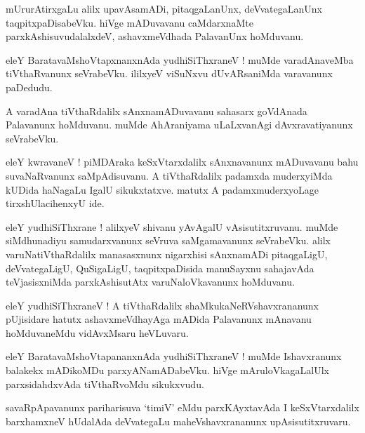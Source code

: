 \documentclass{article}
\begin{document}
\begin{mn}
mUrurAtirxgaLu alilx upavAsamADi, pitaqgaLanUnx, deVvategaLanUnx taqpitxpaDisabeVku. hiVge 
mADuvavanu caMdarxnaMte parxkAshisuvudalalxdeV, ashavxmeVdhada PalavanUnx hoMduvanu.
\end{mn}

\begin{mn}
eleY BaratavaMshoVtapxnanxnAda yudhiSiThxraneV ! muMde varadAnaveMba tiVthaRvanunx seVrabeVku.
ililxyeV viSuNxvu dUvARsaniMda varavanunx paDedudu.
\end{mn}

\begin{mn}
A varadAna tiVthaRdalilx sAnxnamADuvavanu sahasarx goVdAnada Palavanunx hoMduvanu. muMde 
AhAraniyama uLaLxvanAgi dAvxravatiyanunx seVrabeVku.
\end{mn}

\begin{mn}
eleY kwravaneV ! piMDAraka keSxVtarxdalilx sAnxnavanunx  mADuvavanu bahu suvaNaRvanunx 
saMpAdisuvanu. A tiVthaRdalilx padamxda muderxyiMda kUDida haNagaLu IgalU sikukxtatxve. matutx
A padamxmuderxyoLage tirxshUlacihenxyU ide. 
\end{mn}

\begin{mn}
eleY yudhiSiThxrane ! alilxyeV shivanu yAvAgalU vAsisutitxruvanu. muMde siMdhunadiyu 
samudarxvanunx seVruva saMgamavanunx seVrabeVku. alilx  varuNatiVthaRdalilx manasasxnunx 
nigarxhisi sAnxnamADi pitaqgaLigU, deVvategaLigU, QuSigaLigU, taqpitxpaDisida manuSayxnu sahajavAda 
teVjasisxniMda parxkAshisutAtx varuNaloVkavanunx hoMduvanu.
\end{mn}

\begin{mn}
eleY yudhiSiThxraneV !  A tiVthaRdalilx  shaMkukaNeRVshavxrananunx pUjisidare hatutx 
ashavxmeVdhayAga mADida Palavanunx mAnavanu hoMduvaneMdu vidAvxMsaru heVLuvaru.
\end{mn}

\begin{mn}
eleY BaratavaMshoVtapananxnAda yudhiSiThxraneV ! muMde Ishavxranunx balakekx mADikoMDu 
parxyANamADabeVku. hiVge mAruloVkagaLalUlx parxsidahdxvAda tiVthaRvoMdu sikukxvudu.
\end{mn}

\begin{mn}
savaRpApavanunx pariharisuva `timiV' eMdu parxKAyxtavAda I keSxVtarxdalilx barxhamxneV hUdalAda 
deVvategaLu maheVshavxrananunx upAsisutitxruvaru. 
\end{mn}
\end{document}
